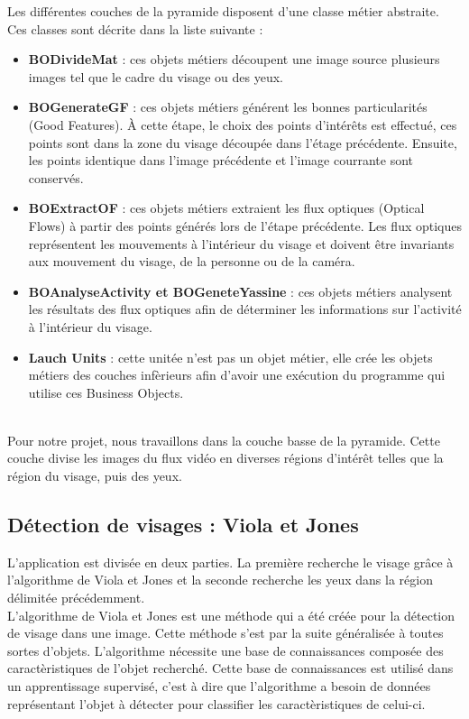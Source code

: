 Les différentes couches de la pyramide disposent d'une classe métier abstraite. Ces classes 
sont décrite dans la liste suivante :\\

\begin{itemize}
 \item \textbf{BODivideMat} : ces objets métiers découpent une image source plusieurs images tel que 
 le cadre du visage ou des yeux.
 \item \textbf{BOGenerateGF} : ces objets métiers générent les bonnes particularités (Good Features). 
 À cette étape, le choix des points d'intérêts est effectué, ces points sont dans la zone du visage 
 découpée dans l'étage précédente. Ensuite, les points identique dans l'image précédente et l'image 
 courrante sont conservés.
 \item \textbf{BOExtractOF} : ces objets métiers extraient les flux optiques (Optical Flows) à partir 
 des points générés lors de l'étape précédente. Les flux optiques représentent les mouvements à l'intérieur 
 du visage et doivent être invariants aux mouvement du visage, de la personne ou de la caméra.
 \item \textbf{BOAnalyseActivity et BOGeneteYassine} : ces objets métiers analysent les résultats 
 des flux optiques afin de déterminer les informations sur l'activité à l'intérieur du visage.
 \item \textbf{Lauch Units} : cette unitée n'est pas un objet métier, elle crée les objets métiers des 
 couches infèrieurs afin d'avoir une exécution du programme qui utilise ces Business Objects.
\end{itemize}
\ \\

Pour notre projet, nous travaillons dans la couche basse de la pyramide. Cette couche divise
les images du flux vidéo en diverses régions d'intérêt telles que la région du visage, puis 
des yeux.

\subsection{Détection de visages : Viola et Jones}
L'application est divisée en deux parties. La première recherche le visage grâce à
l'algorithme de Viola et Jones et la seconde recherche les yeux dans la région délimitée
précédemment.\\

L'algorithme de Viola et Jones\cite{Viola04robustreal-time} est une méthode qui a été créée pour la détection de visage dans une 
image. Cette méthode s'est par la suite généralisée à toutes sortes d'objets. L'algorithme nécessite une 
base de connaissances composée des caractèristiques de l'objet recherché. Cette base de connaissances est utilisé dans un 
apprentissage supervisé, c'est à dire que l'algorithme a besoin de données représentant
l'objet à détecter pour classifier les caractèristiques de celui-ci.\\

